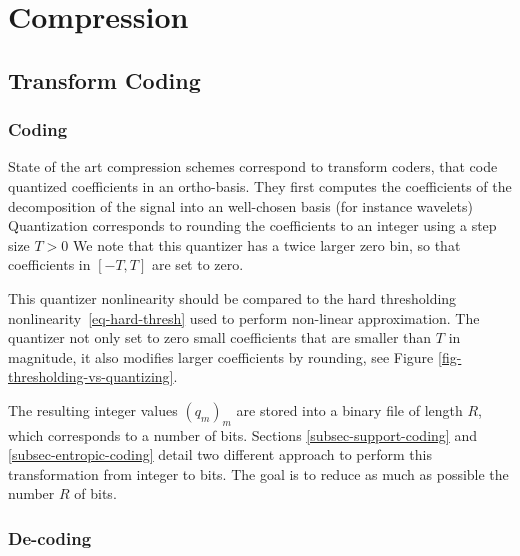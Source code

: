 
\chapter{Compression}


\section{Transform Coding}
\label{sec-transform-coding}

\subsection{Coding}

State of the art compression schemes correspond to transform coders, that code quantized coefficients in an ortho-basis. They first computes the coefficients of the decomposition of the signal into an well-chosen basis (for instance wavelets)
Quantization corresponds to rounding the coefficients to an integer using a step size $T>0$
We note that this quantizer has a twice larger zero bin, so that coefficients in $[-T,T]$ are set to zero.

This quantizer nonlinearity should be compared to the hard thresholding nonlinearity~\eqref{eq-hard-thresh} used to perform non-linear approximation. The quantizer not only set to zero small coefficients that are smaller than $T$ in magnitude, it also modifies larger coefficients by rounding, see Figure \ref{fig-thresholding-vs-quantizing}. 


The resulting integer values $(q_m)_m$ are stored into a binary file of length $R$, which corresponds to a number of bits. 
Sections \ref{subsec-support-coding} and \ref{subsec-entropic-coding} detail two different approach to perform this transformation from integer to bits. The goal is to reduce as much as possible the number $R$ of bits. 

\subsection{De-coding}

